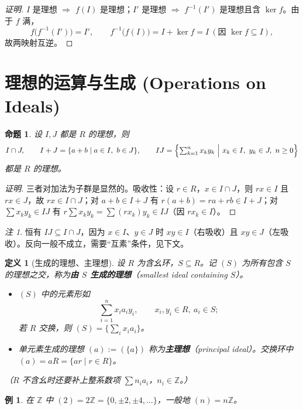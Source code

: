 \documentclass[11pt,a4paper]{ctexart}
\newtheorem*{definition}{定义}
\newtheorem*{example}{例}
\newtheorem*{proposition}{命题}
\theoremstyle{remark}
\newtheorem*{remark}{注}
\begin{document}
\begin{proof}[证明]
$I$ 是理想 $\Rightarrow$ $f(I)$ 是理想；$I'$ 是理想 $\Rightarrow$ $f^{-1}(I')$ 是理想且含 $\ker f$。由于 $f$ 满，
\[
f\bigl(f^{-1}(I')\bigr)=I',\qquad f^{-1}\bigl(f(I)\bigr)=I+\ker f=I\ (\text{因 }\ker f\subseteq I),
\]
故两映射互逆。
\end{proof}

\section*{理想的运算与生成 (Operations on Ideals)}

\begin{proposition}
设 $I,J$ 都是 $R$ 的理想，则
\[
I\cap J,\qquad I+J=\{a+b\mid a\in I,\ b\in J\},\qquad
IJ=\Bigl\{\textstyle\sum_{k=1}^{n}x_ky_k\ \Big|\ x_k\in I,\ y_k\in J,\ n\ge 0\Bigr\}
\]
都是 $R$ 的理想。
\end{proposition}

\begin{proof}[证明]
三者对加法为子群是显然的。吸收性：设 $r\in R$，$x\in I\cap J$，则 $rx\in I$ 且 $rx\in J$，故 $rx\in I\cap J$；对 $a+b\in I+J$ 有 $r(a+b)=ra+rb\in I+J$；对 $\sum x_ky_k\in IJ$ 有 $r\sum x_ky_k=\sum (rx_k)y_k\in IJ$（因 $rx_k\in I$）。
\end{proof}

\begin{remark}
恒有 $IJ\subseteq I\cap J$，因为 $x\in I$、$y\in J$ 时 $xy\in I$（右吸收）且 $xy\in J$（左吸收）。反向一般不成立，需要“互素”条件，见下文。
\end{remark}

\begin{definition}[生成的理想、主理想]
设 $R$ 为含幺环，$S\subseteq R$。记 $(S)$ 为所有包含 $S$ 的理想之交，称为\textbf{由 $S$ 生成的理想}（smallest ideal containing $S$）。
\begin{itemize}
    \item $(S)$ 中的元素形如
    \[
    \sum_{i=1}^{n}x_ia_iy_i,\qquad x_i,y_i\in R,\ a_i\in S ;
    \]
    若 $R$ 交换，则 $(S)=\bigl\{\sum_i x_ia_i\bigr\}$。
    \item 单元素生成的理想 $(a):=(\{a\})$ 称为\textbf{主理想}（principal ideal）。交换环中 $(a)=aR=\{ar\mid r\in R\}$。
\end{itemize}
（$R$ 不含幺时还要补上整系数项 $\sum n_ia_i$，$n_i\in\mathbb{Z}$。）
\end{definition}

\begin{example}
在 $\mathbb{Z}$ 中 $(2)=2\mathbb{Z}=\{0,\pm 2,\pm 4,\dots\}$，一般地 $(n)=n\mathbb{Z}$。
\end{example}
\end{document}
